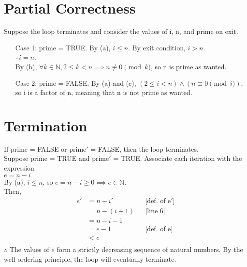 \documentclass{article}
\begin{document}
	\section*{Partial Correctness}
	Suppose the loop terminates  and consider the values of i, n, and prime on exit.\\
	\begin{enumerate}[leftmargin=.8cm, labelsep=0cm, align=left]
		\item[Case 1: ] prime = TRUE. By (a), $i \leq n$. By exit condition, $i > n$. \\ $\therefore i=n$.\\By (b), $\forall k \in \mathbb{N}, 2 \leq k < n \implies n \not\equiv 0 \pmod{k}$, so n is prime as wanted.
		\item[Case 2: ] prime = FALSE. By (a) and (c), $(2 \leq i < n) \land (n \equiv 0 \pmod{i})$, so i is a factor of n, meaning that n is not prime as wanted.
	\end{enumerate}
	\section*{Termination}
	If prime = FALSE or prime$'$ = FALSE, then the loop terminates.\\
	Suppose prime = TRUE and prime$'$ = TRUE. Associate each iteration with the expression\\ \(e=n-i\) \\By (a), $i \leq n$, so $e = n-i \geq 0 \implies e \in \mathbb{N}$. \\
	Then,
	\begin{align*}
		e' &= n-i' &&\text{[def. of e$'$]}\\
		    &= n-(i+1) &&\text{[line 6]}\\
		    &= n-i-1\\
		    &= e-1 &&\text{[def. of e]}\\
		    &<e\\ 
	\end{align*}
	$\therefore$ The values of $e$ form a strictly decreasing sequence of natural numbers. By the well-ordering principle, the loop will eventually terminate. 
\end{document}
